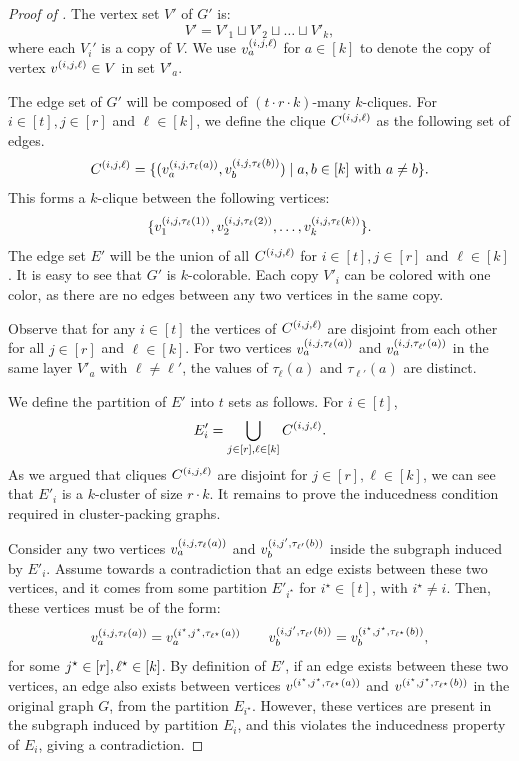 \documentclass[11pt]{article}
\theoremstyle{definition}
\newcommand{\istar}{\ensuremath{i^{\star}}}
\begin{document}
\begin{proof}[Proof of ]
The vertex set $V'$ of $G'$ is:
\[
V' = V'_1 \sqcup V'_2 \sqcup \ldots \sqcup V'_k, 
\]
where each $V_i'$ is a copy of $V$. 
We use $v^{(i,j, \ell)}_a$ for $a \in [k]$ to denote the copy of vertex $v^{(i,j, \ell)} \in V$ in set $V'_a$. 

The edge set of $G'$ will be composed of $(t \cdot r \cdot k)$-many $k$-cliques. 
For $i \in [t], j\in [r]$ and $\ell \in [k]$, we define the clique $C^{(i, j, \ell)}$ as the following set of edges. 
\[
	C^{(i,j,\ell)} = \{(v^{(i,j, \tau_{\ell}(a))}_{a}, v^{(i,j, \tau_{\ell}(b))}_b) \mid a, b \in [k] \textnormal{ with } a \neq b \}.
\]
This forms a $k$-clique between the following vertices:
\[
	\{ v^{(i,j, \tau_{\ell}(1))}_{1}, v^{(i,j, \tau_{\ell}(2))}_2, \ldots, v^{(i,j, \tau_{\ell}(k))}_k\}.
\]
The edge set $E'$ will be the union of all $C^{(i,j, \ell)}$ for $i \in [t], j \in[r]$ and $\ell \in [k]$.
It is easy to see that $G'$ is $k$-colorable. Each copy $V'_i$ can be colored with one color, as there are no edges between any two vertices in the same copy. 

Observe that for any $i \in[t]$ the vertices of $C^{(i, j, \ell)}$ are disjoint from each other for all $j \in [r]$ and $\ell \in [k]$. For two vertices $v^{(i,j, \tau_{\ell}(a))}_{a}$ and $v^{(i,j, \tau_{\ell'}(a))}_a$ in the same layer $V'_{a}$ with $\ell \neq \ell'$, the values of $\tau_{\ell}(a)$ and $\tau_{\ell'}(a)$ are distinct. %

We define the partition of $E'$ into $t$ sets as follows. For $i \in [t]$, 
\[
	E'_i = \bigcup_{j \in [r], \ell \in [k]} C^{(i, j, \ell)}.
\]
As we argued that cliques $C^{(i,j, \ell)}$ are disjoint for $j \in [r], \ell \in [k]$, we can see that $E'_i$ is a $k$-cluster of size $r \cdot k$. It remains to prove the inducedness condition required in cluster-packing graphs. 

Consider any two vertices $v^{(i,j, \tau_{\ell}(a))}_a$ and $v^{(i,j', \tau_{\ell'}(b))}_b$ inside the subgraph induced by $E'_i$. Assume towards a contradiction that an edge exists between these two vertices, and it comes from some partition $E'_{\istar}$ for $\istar \in [t]$, with $\istar \neq i$. 
Then, these vertices must be of the form:
\[
	\vij{i}{j, \tau_{\ell}(a)}_a = \vij{\istar}{\jstarb, \tau_{\ellstar}(a)}_a \qquad  \vij{i}{j', \tau_{\ell'}(b)}_b = \vij{\istar}{\jstarb, \tau_{\ellstar}(b)}_b,
\]
for some $j^{\star} \in [r], \ell^{\star} \in [k]$. 
By definition of $E'$, if an edge exists between these two vertices, an edge also exists between vertices $\vij{\istar}{\jstarb, \tau_{\ellstar}(a)}$ and $\vij{\istar}{\jstarb, \tau_{\ellstar}(b)}$ in the original graph $G$, from the partition $E_{\istar}$. However, these vertices are present in the subgraph induced by partition $E_i$, and this violates the inducedness property of $E_i$, giving a contradiction. 
\end{proof}
\end{document}
